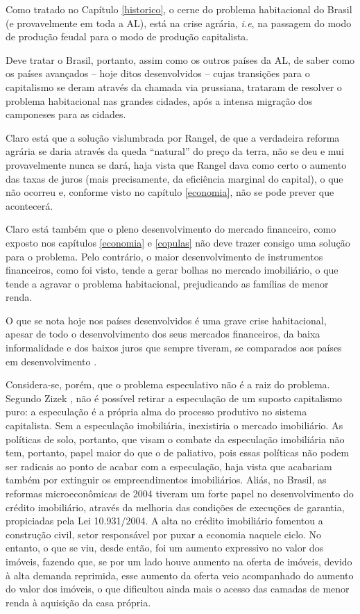 \documentclass[
	12pt,				%
	oneside,			%
	a4paper,			%
	chapter=TITLE,		%
	section=TITLE,		%
	english,			%
	brazil				%
	]{abntex2}
\begin{document}
Como tratado no Capítulo \ref{historico}, o cerne do problema habitacional
do Brasil (e provavelmente em toda a \gls{AL}), está na crise agrária,
\emph{i.e}, na passagem do modo de produção feudal para o modo de produção
capitalista.

Deve tratar o Brasil, portanto, assim como os outros países da \gls{AL},
de saber como os países avançados -- hoje ditos desenvolvidos -- cujas
transições para o capitalismo se deram através da chamada via prussiana,
trataram de resolver o problema habitacional nas grandes cidades, após a intensa
migração dos camponeses para as cidades.

Claro está que a solução vislumbrada por Rangel, de que a verdadeira reforma
agrária se daria através da queda ``natural'' do preço da terra, não se deu e mui
provavelmente nunca se dará, haja vista que Rangel dava como certo o aumento das
taxas de juros (mais precisamente, da eficiência marginal do capital), o que não
ocorreu e, conforme visto no capítulo \ref{economia}, não se pode prever que
acontecerá.

Claro está também que o pleno desenvolvimento do mercado financeiro, como
exposto nos capítulos \ref{economia} e \ref{copulas} não deve trazer consigo
uma solução para o problema. Pelo contrário, o maior desenvolvimento de
instrumentos financeiros, como foi visto, tende a gerar bolhas no mercado
imobiliário, o que tende a agravar o problema habitacional, prejudicando as
famílias de menor renda.

O que se nota hoje nos países desenvolvidos é uma grave crise habitacional,
apesar de todo o desenvolvimento dos seus mercados financeiros, da baixa
informalidade e dos baixos juros que sempre tiveram, se comparados aos países em
desenvolvimento \autocite{housing-europe,california}.

Considera-se, porém, que o problema especulativo não é a raiz do problema.
Segundo Zizek \autocite*[220-221]{zizek2005}, não é possível retirar a especulação de um
suposto capitalismo puro: a especulação é a própria alma do processo produtivo
no sistema capitalista. Sem a especulação imobiliária, inexistiria o mercado
imobiliário. As políticas de solo, portanto, que visam o combate da especulação
imobiliária não tem, portanto, papel maior do que o de paliativo, pois essas
políticas não podem ser radicais ao ponto de acabar com a especulação, haja
vista que acabariam também por extinguir os empreendimentos imobiliários. Aliás,
no Brasil, as reformas microeconômicas de 2004 tiveram um forte papel no
desenvolvimento do crédito imobiliário, através da melhoria das condições de
execuções de garantia, propiciadas pela Lei 10.931/2004. A alta no crédito
imobiliário fomentou a construção civil, setor responsável por puxar a economia
naquele ciclo. No entanto, o que se viu, desde então, foi um aumento expressivo
no valor dos imóveis, fazendo que, se por um lado houve aumento na oferta de
imóveis, devido à alta demanda reprimida, esse aumento da oferta veio
acompanhado do aumento do valor dos imóveis, o que dificultou ainda mais o
acesso das camadas de menor renda à aquisição da casa própria.
\end{document}
